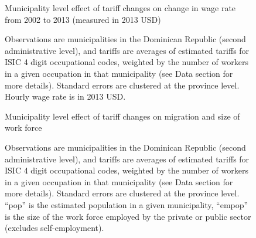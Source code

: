 \documentclass[12pt]{article}
\begin{document}
\begin{landscape}
\begin{figure}[H]
\begin{center}
Municipality level effect of tariff changes on change in wage rate from 2002 to 2013 (measured
in 2013 USD)

\caption{\label{fig:Table1}}
\end{center}
Observations are municipalities in the Dominican Republic (second administrative level),
and tariffs are averages of estimated tariffs for ISIC 4 %
digit occupational codes,
weighted by the number of workers in a given occupation in that municipality 
(see Data section for more details). Standard errors are clustered at the province level.
Hourly wage rate is in 2013 USD.
\end{figure}
\end{landscape}

\begin{figure}[H]
\begin{center}
Municipality level effect of tariff changes on migration and size of work force

\caption{\label{fig:Table3}}
\end{center}
Observations are municipalities in the Dominican Republic (second administrative level),
and tariffs are averages of estimated tariffs for ISIC 4 %
digit occupational codes,
weighted by the number of workers in a given occupation in that municipality 
(see Data section for more details). Standard errors are clustered at the province level.
``pop'' is the estimated population in a given municipality, ``empop'' is the size of
the work force employed by the private or public sector (excludes self-employment).
\end{figure}
\end{document}
